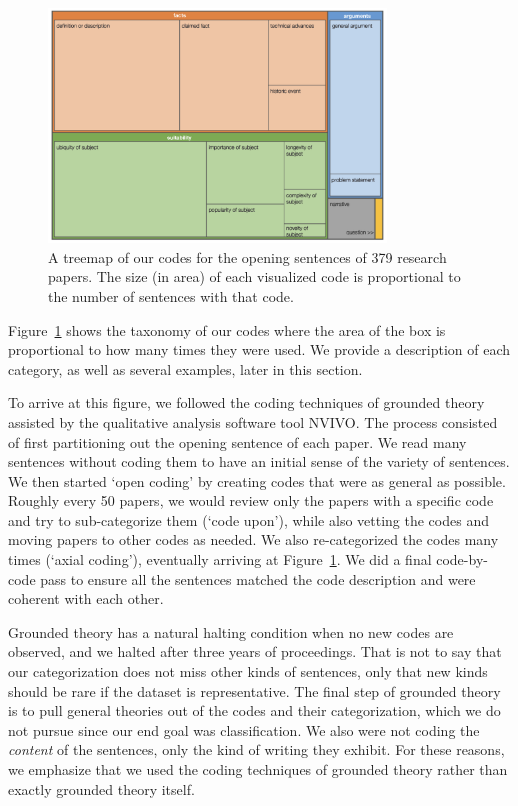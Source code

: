 \documentclass[sigconf,anonymous]{acmart}
\begin{document}
\label{sec:categories}
\begin{figure}[t]
	\centering
	\includegraphics[width=0.8\textwidth]{image.png}
	\caption{A treemap of our codes for the opening sentences of 379 research papers. The size (in area) of each visualized code is proportional to the number of sentences with that code.}
	\label{fig:treemap}
\end{figure}
	
	
	
	Figure~\ref{fig:treemap} shows the taxonomy of our codes where the area of the box is proportional to how many times they were used. We provide a description of each category, as well as several examples, later in this section.
	
	To arrive at this figure, we followed the coding techniques of grounded theory assisted by the qualitative analysis software tool NVIVO. The process consisted of first partitioning out the opening sentence of each paper. We read many sentences without coding them to have an initial sense of the variety of sentences. We then started `open coding' by creating codes that were as general as possible. Roughly every 50 papers, we would review only the papers with a specific code and try to sub-categorize them (`code upon'), while also vetting the codes and moving papers to other codes as needed. We also re-categorized the codes many times (`axial coding'), eventually arriving at Figure~\ref{fig:treemap}. We did a final code-by-code pass to ensure all the sentences matched the code description and were coherent with each other. 
	
	Grounded theory has a natural halting condition when no new codes are observed, and we halted after three years of proceedings. That is not to say that our categorization does not miss other kinds of sentences, only that new kinds should be rare if the dataset is representative. The final step of grounded theory is to pull general theories out of the codes and their categorization, which we do not pursue since our end goal was classification. We also were not coding the \textit{content} of the sentences, only the kind of writing they exhibit. For these reasons, we emphasize that we used the coding techniques of grounded theory rather than exactly grounded theory itself. 
		
\end{document}
